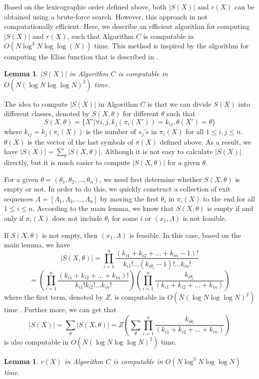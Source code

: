 \documentclass[journal]{IEEEtran}
\newtheorem{Lemma}[Theorem]{Lemma}
\begin{document}
Based on the lexicographic order defined above, both $|S(X)|$ and $r(X)$ can be obtained using a brute-force search. However, this approach in not computationally efficient.
Here, we describe an efficient algorithm for computing $|S(X)|$ and $r(X)$, such that Algorithm $C$ is computable in $O(N \log^3 N \log\log (N))$ time. This method is inspired by the algorithm for computing the Elias function that is described in \cite{Ryabko2000}.

\begin{Lemma}
$|S(X)|$ in Algorithm $C$ is computable in $O(N(\log N\log\log N)^2)$ time.
\end{Lemma}

\proof
The idea to compute $|S(X)|$ in Algorithm $C$ is that we can divide $S(X)$ into different classes,
denoted by $S(X,\theta)$ for different $\theta$ such that
$$S(X,\theta)=\{X'|\forall i,j, k_j(\pi_i(X'))=k_{ij}, \theta(X')=\theta\}$$
where $k_{ij}=k_j(\pi_i(X))$ is the number of $s_j$'s in $\pi_i(X)$ for all
$1\leq i,j\leq n$. $\theta(X)$ is the vector of the last symbols of $\pi(X)$ defined above.
As a result, we have $|S(X)|=\sum_{\theta}|S(X,\theta)|$. Although it is not easy to calculate $|S(X)|$ directly, but it is much easier to
compute $|S(X,\theta)|$ for a given $\theta$.

For a given $\theta=(\theta_1,\theta_2,...,\theta_n)$, we need first determine whether $S(X,\theta)$ is empty or not. In order to do this, we quickly construct a collection of
exit sequences $\Lambda=[\Lambda_1,\Lambda_2,...,\Lambda_n]$ by moving the first $\theta_i$ in $\pi_i(X)$ to the end for all $1\leq i\leq n$. According to the main lemma,
we know that $S(X,\theta)$ is empty if and only if $\pi_i(X)$ does not include $\theta_i$ for some $i$ or $(x_1,\Lambda)$ is not feasible.

If $S(X,\theta)$ is not empty, then $(x_1,\Lambda)$ is feasible. In this case, based on the main lemma, we have
$$|S(X,\theta)|=\prod_{i=1}^n \frac{(k_{i1}+k_{i2}+...+k_{in}-1)!}{k_{i1}!...(k_{i\theta_i}-1)!...k_{in}!}$$
$$= (\prod_{i=1}^n \frac{(k_{i1}+k_{i2}+...+k_{in})!}{k_{i1}!k_{i2}!...k_{in}!})(\prod_{i=1}^n\frac{k_{i\theta_i}}{(k_{i1}+k_{i2}+...+k_{in})})$$
where the first term, denoted by $Z$, is computable in $O(N(\log N\log\log N)^2)$ time \cite{Borwein1985}. Further more, we can get that
$$|S(X)|=\sum_{\theta}|S(X,\theta)|=Z(\sum_{\theta}\prod_{i=1}^n\frac{k_{i\theta_i}}{(k_{i1}+k_{i2}+...+k_{in})})$$ is also computable in $O(N(\log N\log\log N)^2)$ time.
\hfill\QED

\begin{Lemma} $r(X)$ in Algorithm $C$ is computable in $O(N\log^3 N\log\log N)$ time.
\end{Lemma}
\end{document}
